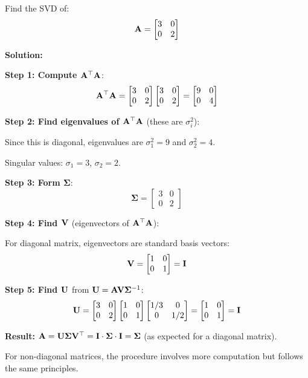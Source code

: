 \begin{examplebox}[title=Example: Computing SVD for a Simple Matrix]
Find the SVD of:
\[
\mathbf{A} = \begin{bmatrix} 3 & 0 \\ 0 & 2 \end{bmatrix}
\]

\textbf{Solution:}

\textbf{Step 1: Compute $\mathbf{A}^\top\mathbf{A}$}:
\[
\mathbf{A}^\top\mathbf{A} = \begin{bmatrix} 3 & 0 \\ 0 & 2 \end{bmatrix}\begin{bmatrix} 3 & 0 \\ 0 & 2 \end{bmatrix} = \begin{bmatrix} 9 & 0 \\ 0 & 4 \end{bmatrix}
\]

\textbf{Step 2: Find eigenvalues of $\mathbf{A}^\top\mathbf{A}$} (these are $\sigma_i^2$):

Since this is diagonal, eigenvalues are $\sigma_1^2 = 9$ and $\sigma_2^2 = 4$.

Singular values: $\sigma_1 = 3$, $\sigma_2 = 2$.

\textbf{Step 3: Form $\boldsymbol{\Sigma}$}:
\[
\boldsymbol{\Sigma} = \begin{bmatrix} 3 & 0 \\ 0 & 2 \end{bmatrix}
\]

\textbf{Step 4: Find $\mathbf{V}$} (eigenvectors of $\mathbf{A}^\top\mathbf{A}$):

For diagonal matrix, eigenvectors are standard basis vectors:
\[
\mathbf{V} = \begin{bmatrix} 1 & 0 \\ 0 & 1 \end{bmatrix} = \mathbf{I}
\]

\textbf{Step 5: Find $\mathbf{U}$} from $\mathbf{U} = \mathbf{A}\mathbf{V}\boldsymbol{\Sigma}^{-1}$:
\[
\mathbf{U} = \begin{bmatrix} 3 & 0 \\ 0 & 2 \end{bmatrix}\begin{bmatrix} 1 & 0 \\ 0 & 1 \end{bmatrix}\begin{bmatrix} 1/3 & 0 \\ 0 & 1/2 \end{bmatrix} = \begin{bmatrix} 1 & 0 \\ 0 & 1 \end{bmatrix} = \mathbf{I}
\]

\textbf{Result:} $\mathbf{A} = \mathbf{U}\boldsymbol{\Sigma}\mathbf{V}^\top = \mathbf{I} \cdot \boldsymbol{\Sigma} \cdot \mathbf{I} = \boldsymbol{\Sigma}$ (as expected for a diagonal matrix).

For non-diagonal matrices, the procedure involves more computation but follows the same principles.
\end{examplebox}

